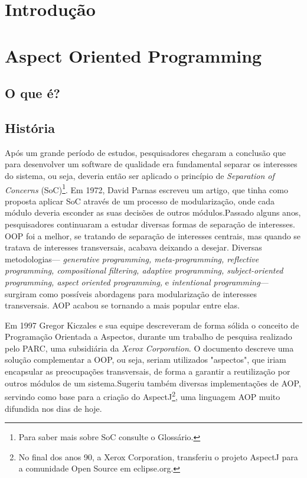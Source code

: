 \documentclass[tc,openright]{iiufrgs}
\begin{document}
\chapter{Introdução}

\chapter{Aspect Oriented Programming}
\section{O que é?}

\section{História}
Após um grande período de estudos, pesquisadores chegaram a conclusão que para desenvolver um software de qualidade era fundamental separar os interesses do sistema, ou seja, deveria então ser aplicado o princípio de \textit{Separation of Concerns} (SoC)\footnote{Para saber mais sobre SoC consulte o Glossário.}. Em 1972, David Parnas escreveu um artigo, que tinha como  proposta aplicar SoC através de um processo de modularização, onde cada módulo deveria esconder as suas decisões de outros módulos.Passado alguns anos, pesquisadores continuaram a estudar diversas formas de separação de interesses. OOP foi a melhor, se tratando de separação de interesses centrais, mas quando se tratava de interesses transversais, acabava deixando a desejar. Diversas metodologias— \textit{generative programming, meta-programming, reflective programming, compositional filtering, adaptive programming, subject-oriented programming, aspect oriented programming,} e  \textit{intentional programming}— surgiram como possíveis abordagens para modularização de interesses transversais. AOP acabou se tornando a mais popular entre elas. \cite{laddad2003aspectj}

Em 1997 Gregor Kiczales e sua equipe descreveram de forma sólida o conceito de Programação Orientada a Aspectos, durante um trabalho de pesquisa realizado pelo PARC, uma subsidiária da \textit{Xerox Corporation}. O documento descreve uma solução complementar a OOP, ou seja, seriam utilizados "aspectos", que iriam encapsular as preocupações transversais, de forma a garantir a reutilização por outros módulos de um sistema.Sugeriu também diversas implementações de AOP, servindo como base para a criação do AspectJ\footnote{No final dos anos 90, a Xerox Corporation, transferiu o projeto AspectJ para a comunidade Open Source em eclipse.org.}, uma linguagem AOP muito difundida nos dias de hoje.\cite{groves2013aop}
\end{document}
